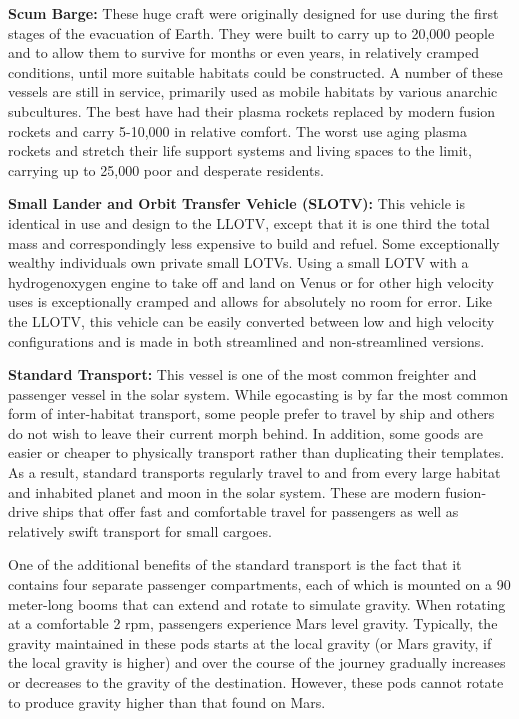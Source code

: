 \textbf{Scum Barge:} These huge craft were originally designed for use during the first stages of the evacuation of Earth. They were built to carry up to 20,000 people and to allow them to survive for months or even years, in relatively cramped conditions, until more suitable habitats could be constructed. A number of these vessels are still in service, primarily used as mobile habitats by various anarchic subcultures. The best have had their plasma rockets replaced by modern fusion rockets and carry 5-10,000 in relative comfort. The worst use aging plasma rockets and stretch their life support systems and living spaces to the limit, carrying up to 25,000 poor and desperate residents. 

\textbf{Small Lander and Orbit Transfer Vehicle (SLOTV):} This vehicle is identical in use and design to the LLOTV, except that it is one third the total mass and correspondingly less expensive to build and refuel. Some exceptionally wealthy individuals own private small LOTVs. Using a small LOTV with a hydrogenoxygen engine to take off and land on Venus or for other high velocity uses is exceptionally cramped and allows for absolutely no room for error. Like the LLOTV, this vehicle can be easily converted between low and high velocity configurations and is made in both streamlined and non-streamlined versions. 

\textbf{Standard Transport:} This vessel is one of the most common freighter and passenger vessel in the solar system. While egocasting is by far the most common form of inter-habitat transport, some people prefer to travel by ship and others do not wish to leave their current morph behind. In addition, some goods are easier or cheaper to physically transport rather than duplicating their templates. As a result, standard transports regularly travel to and from every large habitat and inhabited planet and moon in the solar system. These are modern fusion-drive ships that offer fast and comfortable travel for passengers as well as relatively swift transport for small cargoes. 

One of the additional benefits of the standard transport is the fact that it contains four separate passenger compartments, each of which is mounted on a 90 meter-long booms that can extend and rotate to simulate gravity. When rotating at a comfortable 2 rpm, passengers experience Mars level gravity. Typically, the gravity maintained in these pods starts at the local gravity (or Mars gravity, if the local gravity is higher) and over the course of the journey gradually increases or decreases to the gravity of the destination. However, these pods cannot rotate to produce gravity higher than that found on Mars. 

